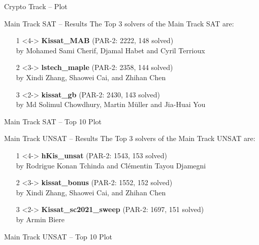 \documentclass{beamer}
\begin{document}
\begin{frame}{Crypto Track -- Plot}
\centering
{}
\end{frame}


\begin{frame}{Main Track SAT -- Results}
The Top 3 solvers of the Main Track SAT are:
\begin{itemize}
\item[1]<4-> {\bf Kissat\_MAB} (PAR-2: 2222, 148 solved)\\
by Mohamed Sami Cherif, Djamal Habet and Cyril Terrioux
\item[2]<3-> {\bf lstech\_maple}  (PAR-2: 2358, 144 solved)\\
by Xindi Zhang, Shaowei Cai, and Zhihan Chen
\item[3]<2-> {\bf kissat\_gb} (PAR-2: 2430, 143 solved)\\
by Md Solimul Chowdhury, Martin Müller and Jia-Huai You
\end{itemize}
\end{frame}

\begin{frame}{Main Track SAT -- Top 10 Plot}
\centering
\resizebox{.9\textwidth}{!}{%

}
\end{frame}

\begin{frame}{Main Track UNSAT -- Results}
The Top 3 solvers of the Main Track UNSAT are:
\begin{itemize}
\item[1]<4-> 
{\bf hKis\_unsat}  (PAR-2: 1543, 153 solved)\\
by Rodrigue Konan Tchinda and Clémentin Tayou Djamegni
\item[2]<3-> {\bf kissat\_bonus} (PAR-2: 1552, 152 solved)\\
by Xindi Zhang, Shaowei Cai, and Zhihan Chen
\item[3]<2-> {\bf Kissat\_sc2021\_sweep} (PAR-2: 1697, 151 solved)  \\
by Armin Biere
\end{itemize}
\end{frame}


\begin{frame}{Main Track UNSAT -- Top 10 Plot}
\centering
\resizebox{.9\textwidth}{!}{%

}
\end{frame}
\end{document}
